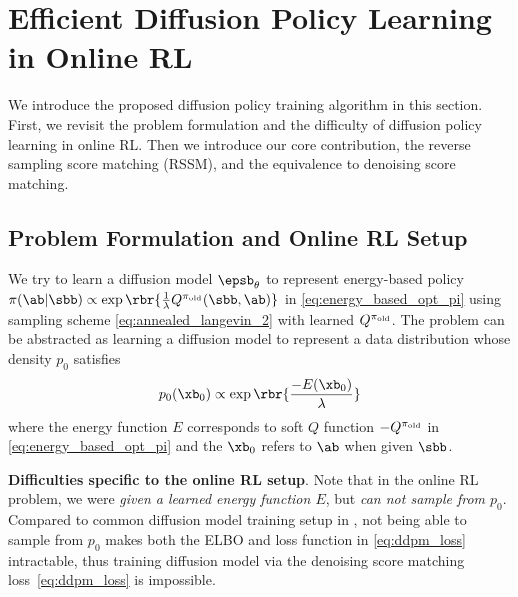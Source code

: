\section{Efficient Diffusion Policy Learning in Online RL}
\label{sec:rssm}

We introduce the proposed diffusion policy training algorithm in this section. First, we revisit the problem formulation and the difficulty of diffusion policy learning in online RL.
Then we introduce our core contribution, the reverse sampling score matching (RSSM), and the equivalence to denoising score matching.

\subsection{Problem Formulation and Online RL Setup}
We try to learn a diffusion model $\epsb_\theta $ to represent energy-based policy $\pi(\ab|\sbb)\propto \exp\rbr{\frac{1}{\lambda}{Q^{\pi_{\rm old}}(\sbb, \ab)}}$ in \eqref{eq:energy_based_opt_pi} using sampling scheme \eqref{eq:annealed_langevin_2} with learned $Q^{\pi_{\rm old}}$.
The problem can be abstracted as learning a diffusion model to represent a data distribution whose density $p_0$ satisfies
\begin{equation}
    p_0(\xb_0)\propto\exp\rbr{\frac{-E(\xb_0)}{\lambda}}\label{eq:prob_abstract}
\end{equation}
where the energy function $E$ corresponds to soft $Q$ function $-Q^{\pi_{\rm old}}$ in \eqref{eq:energy_based_opt_pi} and the $\xb_0$ refers to $\ab$ when given $\sbb$.

\textbf{Difficulties specific to the online RL setup}. Note that in the online RL problem, we were \emph{given a learned energy function $E$}, but \emph{can not sample from $p_0$}. 
Compared to common diffusion model training setup in , not being able to sample from $p_0$ makes both the ELBO and loss function in \eqref{eq:ddpm_loss} intractable, thus training diffusion model via the denoising score matching loss~\eqref{eq:ddpm_loss} is impossible.
    
